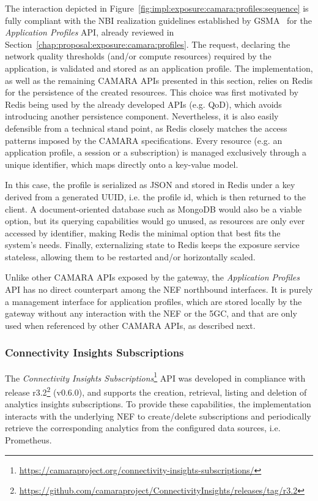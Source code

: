 The interaction depicted in Figure~\ref{fig:impl:exposure:camara:profiles:sequence} is fully compliant with the \acs{NBI} realization guidelines established by \acs{GSMA}~\cite{gsmaNbiRealization} for the \textit{Application Profiles} \acs{API}, already reviewed in Section~\ref{chap:proposal:exposure:camara:profiles}. The request, declaring the network quality thresholds (and/or compute resources) required by the application, is validated and stored as an application profile. The implementation, as well as the remaining CAMARA \acsp{API} presented in this section, relies on Redis for the persistence of the created resources. This choice was first motivated by Redis being used by the already developed \acsp{API} (e.g. \acs{QoD}), which avoids introducing another persistence component. Nevertheless, it is also easily defensible from a technical stand point, as Redis closely matches the access patterns imposed by the CAMARA specifications. Every resource (e.g. an application profile, a session or a subscription) is managed exclusively through a unique identifier, which maps directly onto a key-value model. 

In this case, the profile is serialized as \acs{JSON} and stored in Redis under a key derived from a generated \acs{UUID}, i.e. the profile id, which is then returned to the client. A document-oriented database such as MongoDB would also be a viable option, but its querying capabilities would go unused, as resources are only ever accessed by identifier, making Redis the minimal option that best fits the system's needs. Finally, externalizing state to Redis keeps the exposure service stateless, allowing them to be restarted and/or horizontally scaled.

Unlike other CAMARA \acsp{API} exposed by the gateway, the \textit{Application Profiles} \acs{API} has no direct counterpart among the \acs{NEF} northbound interfaces. It is purely a management interface for application profiles, which are stored locally by the gateway without any interaction with the \acs{NEF} or the \acs{5GC}, and that are only used when referenced by other CAMARA \acsp{API}, as described next.

\subsubsection{Connectivity Insights Subscriptions}
\label{chap:impl:exposure:camara:insights}

The \textit{Connectivity Insights Subscriptions}\footnote{\url{https://camaraproject.org/connectivity-insights-subscriptions/}} \acs{API} was developed in compliance with release r3.2\footnote{\url{https://github.com/camaraproject/ConnectivityInsights/releases/tag/r3.2}} (v0.6.0), and supports the creation, retrieval, listing and deletion of analytics insights subscriptions. To provide these capabilities, the implementation interacts with the underlying \acs{NEF} to create/delete subscriptions and periodically retrieve the corresponding analytics from the configured data sources, i.e. Prometheus.

